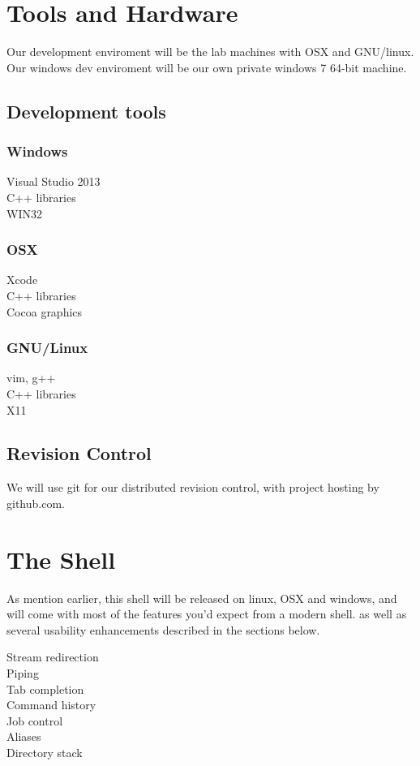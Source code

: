 \documentclass[a4paper,12pt]{article}
\begin{document}
\pagebreak
\section*{Tools and Hardware}

Our development enviroment will be the lab machines with OSX and GNU/linux.
Our windows dev enviroment will be our own private windows 7 64-bit machine.
\subsection*{Development tools}
\begin{multicols}{3}
  \subsubsection*{Windows}
    Visual Studio 2013 \\
    C++ libraries \\
    WIN32 \columnbreak
  \subsubsection*{OSX}
    Xcode \\
    C++ libraries \\
    Cocoa graphics \columnbreak
  \subsubsection*{GNU/Linux}
    vim, g++ \\
    C++ libraries \\
    X11
\end{multicols}
\subsection*{Revision Control}
We will use git for our distributed revision control, with project hosting by github.com.
\section*{The Shell}
As mention earlier, this shell will be released on linux, OSX and windows, and will come with most of the features you'd expect from a modern shell. as well as several usability enhancements described in the sections below.
\begin{multicols}{4}
\noindent
Stream redirection \\
Piping \\
Tab completion \\
Command history \\
Job control \\
Aliases \\
Directory stack
\end{multicols}
\end{document}
